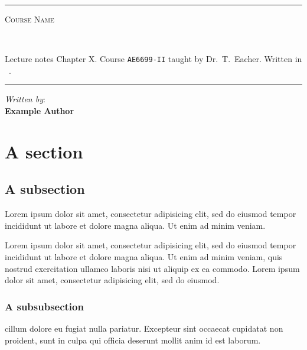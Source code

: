 \documentclass[a4paper, 12pt, twoside, dvipsnames]{article}
\makeatletter
\newcommand{\docsubject}{Lecture notes Chapter X}
\newcommand{\doctitle}{Course Name}
\newcommand{\coursecode}{AE6699-II}
\newcommand{\teacher}{Dr.~T.~Eacher}
\newcommand{\authors}{Example Author}
\newcommand{\Hrule}{\rule{\linewidth}{0.4mm}}
\newcommand{\currentdate}{\monthname~\the\year}
\renewcommand{\tableofcontents}{%
  \@starttoc{toc}%
}
\makeatother
\begin{document}
\begin{titlepage}
\begin{center}
\vspace*{1cm}
\Hrule
\vspace*{0.3cm}
\parbox{\textwidth}{\centering\scshape\fontsize{34pt}{34pt}\selectfont \doctitle \par}
\phantom{.}\vspace*{0.5cm}\\
\parbox{\textwidth}{\centering\fontsize{12pt}{12pt}\selectfont \docsubject. Course \texttt{\coursecode} taught by \teacher. Written in \currentdate.}
\Hrule
\vspace*{0.75cm}
{\centering \emph{Written by}: \\ \textbf{\authors}}
\begin{tcolorbox}[width=0.6\textwidth, arc=0mm, top=10pt, bottom=15pt, colback=white, colframe=black]
    \tableofcontents
\end{tcolorbox}
\end{center}
\end{titlepage}
\pagestyle{plain}


\section{A section}

\subsection{A subsection}
Lorem ipsum dolor sit amet, consectetur adipisicing elit, sed do eiusmod
tempor incididunt ut labore et dolore magna aliqua. Ut enim ad minim veniam.

Lorem ipsum dolor sit amet, consectetur adipisicing elit, sed do eiusmod
tempor incididunt ut labore et dolore magna aliqua. Ut enim ad minim veniam,
quis nostrud exercitation ullamco laboris nisi ut aliquip ex ea commodo.
Lorem ipsum dolor sit amet, consectetur adipisicing elit, sed do eiusmod.

\subsubsection{A subsubsection}
cillum dolore eu fugiat nulla pariatur. Excepteur sint occaecat cupidatat non
proident, sunt in culpa qui officia deserunt mollit anim id est laborum.
\end{document}
